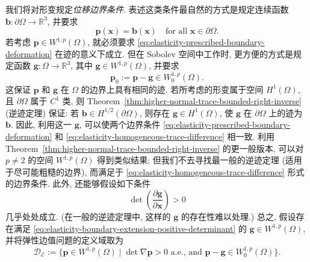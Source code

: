 我们将对形变规定\emph{位移边界条件}. 表述这类条件最自然的方式是规定连续函数 $\bm{b}:\partial\Omega\to\mathbb{R}^3$, 并要求
\begin{equation}\label{eq:elasticity-prescribed-boundary-deformation}
\bm{p}(\bm{x})=\bm{b}(\bm{x})\quad\text{for all }\bm{x}\in\partial\Omega.
\end{equation}
若考虑 $\bm{p}\in W^{1,p}(\Omega)$, 就必须要求 \eqref{eq:elasticity-prescribed-boundary-deformation} 在迹的意义下成立. 但在 Sobolev 空间中工作时, 更方便的方式是规定函数 $\bm{g}:\Omega\to\mathbb{R}^3$, 其中 $\bm{g}\in W^{1,p}(\Omega)$, 并要求
\begin{equation}\label{eq:elasticity-homogeneous-trace-difference}
\bm{p}_0:=\bm{p}-\bm{g}\in W_0^{1,p}(\Omega).
\end{equation}
这保证 $\bm{p}$ 和 $\bm{g}$ 在 $\Omega$ 的边界上具有相同的迹. 若所考虑的形变属于空间 $H^1(\Omega)$, 且 $\partial\Omega$ 属于 $C^1$ 类, 则 Theorem~\ref{thm:higher-normal-trace-bounded-right-inverse} (逆迹定理) 保证: 若 $\bm{b}\in H^{1/2}(\partial\Omega)$, 则存在 $\bm{g}\in H^1(\Omega)$, 使 $\bm{g}$ 在 $\partial\Omega$ 上的迹为 $\bm{b}$. 因此, 利用这一 $\bm{g}$, 可以使两个边界条件 \eqref{eq:elasticity-prescribed-boundary-deformation} 和 \eqref{eq:elasticity-homogeneous-trace-difference} 相一致. 利用 Theorem~\ref{thm:higher-normal-trace-bounded-right-inverse} 的更一般版本, 可以对 $p\neq2$ 的空间 $W^{1,p}(\Omega)$ 得到类似结果; 但我们不去寻找最一般的逆迹定理 (适用于尽可能粗糙的边界), 而满足于 \eqref{eq:elasticity-homogeneous-trace-difference} 形式的边界条件. 此外, 还能够假设如下条件
\begin{equation}\label{eq:elasticity-boundary-extension-positive-determinant}
\det\left(\dfrac{\partial\bm{g}}{\partial\bm{x}}\right)>0
\end{equation}
几乎处处成立. (在一般的逆迹定理中, 这样的 $\bm{g}$ 的存在性难以处理.) 总之, 假设存在满足 \eqref{eq:elasticity-boundary-extension-positive-determinant} 的 $\bm{g}\in W^{1,p}(\Omega)$, 并将弹性边值问题的定义域取为
\begin{equation}\label{eq:elasticity-admissible-deformation-domain}
\mathcal{D}_{\mathcal{E}}:=\{\bm{p}\in W^{1,p}(\Omega)\mid\det\nabla\bm{p}>0\text{ a.e., and }\bm{p}-\bm{g}\in W_0^{1,p}(\Omega)\}.
\end{equation}

